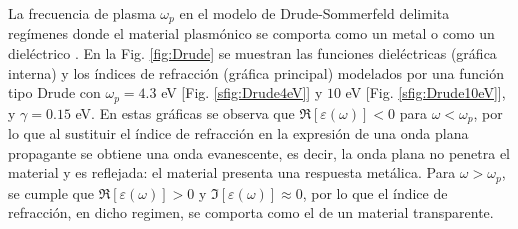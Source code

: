 \documentclass[letterpaper,11pt] {article}
\begin{document}
La frecuencia de plasma $\omega_p$ en el modelo de Drude-Sommerfeld delimita regímenes donde el material plasmónico se comporta como un metal o como un dieléctrico \cite{truger2011properties}.   En la Fig.  \ref{fig:Drude} se muestran las funciones dieléctricas (gráfica interna) y los índices de refracción  (gráfica principal) modelados por una función tipo Drude con $\omega_p=4. 3$ eV [Fig.  \ref{sfig:Drude4eV}] y $10$ eV [Fig.  \ref{sfig:Drude10eV}], y $\gamma=0. 15$ eV.  En estas gráficas se observa que $\Re[\varepsilon(\omega)]<0$ para $\omega<\omega_p$, por lo que al sustituir el índice de refracción en la expresión de una onda plana propagante se obtiene una onda evanescente, es decir, la onda plana no penetra el material y es reflejada: el material presenta una respuesta metálica.  Para $\omega>\omega_p$, se cumple que $\Re[\varepsilon(\omega)]>0$ y $\Im[\varepsilon(\omega)]\approx 0$, por lo que el índice de refracción, en dicho regimen, se comporta como el de un  material transparente. 
\end{document}
